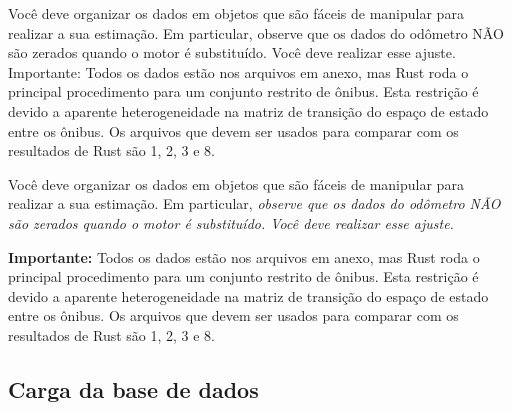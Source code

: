 \documentclass[12pt,a4paper]{article}
\begin{document}
Você deve organizar os dados em objetos que são fáceis de manipular para
realizar a sua estimação. Em particular, observe que os dados do
odômetro NÃO são zerados quando o motor é substituído. Você deve
realizar esse ajuste. Importante: Todos os dados estão nos arquivos em
anexo, mas Rust roda o principal procedimento para um conjunto restrito
de ônibus. Esta restrição é devido a aparente heterogeneidade na matriz
de transição do espaço de estado entre os ônibus. Os arquivos que devem
ser usados para comparar com os resultados de Rust são 1, 2, 3 e 8.

Você deve organizar os dados em objetos que são fáceis de manipular para
realizar a sua estimação. Em particular, \emph{observe que os dados do
odômetro NÃO são zerados quando o motor é substituído. Você deve
realizar esse ajuste.}

\textbf{Importante:} Todos os dados estão nos arquivos em anexo, mas
Rust roda o principal procedimento para um conjunto restrito de ônibus.
Esta restrição é devido a aparente heterogeneidade na matriz de
transição do espaço de estado entre os ônibus. Os arquivos que devem ser
usados para comparar com os resultados de Rust são 1, 2, 3 e 8.

\hypertarget{carga-da-base-de-dados}{%
\subsection{Carga da base de dados}\label{carga-da-base-de-dados}}
\end{document}
